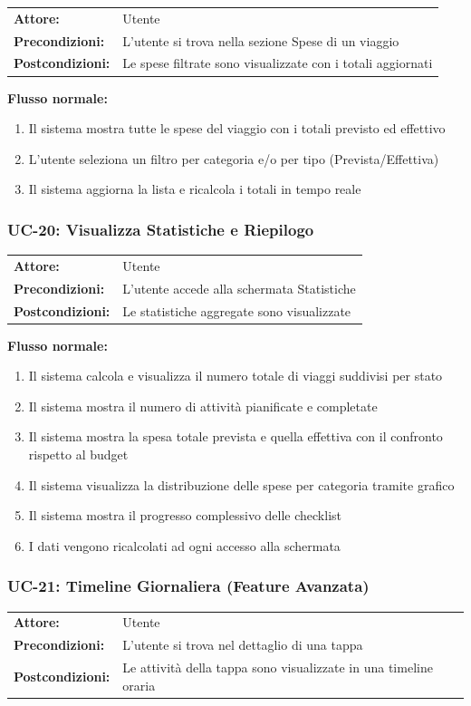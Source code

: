 \documentclass[12pt, a4paper]{article}
\makeatletter
\newcommand{\ucblock}[3]{%
  \noindent
  \begin{tabular}{@{}ll@{}}
    \textbf{Attore:}         & #1 \\
    \textbf{Precondizioni:}  & #2 \\
    \textbf{Postcondizioni:} & #3 \\
  \end{tabular}%
  \medskip
}
\makeatother
\begin{document}
\ucblock{Utente}{L'utente si trova nella sezione Spese di un viaggio}{Le spese filtrate sono visualizzate con i totali aggiornati}

\noindent\textbf{Flusso normale:}
\begin{enumerate}[leftmargin=1.5em, itemsep=1pt]
  \item Il sistema mostra tutte le spese del viaggio con i totali previsto ed effettivo
  \item L'utente seleziona un filtro per categoria e/o per tipo (Prevista/Effettiva)
  \item Il sistema aggiorna la lista e ricalcola i totali in tempo reale
\end{enumerate}

\subsubsection{UC-20: Visualizza Statistiche e Riepilogo}

\ucblock{Utente}{L'utente accede alla schermata Statistiche}{Le statistiche aggregate sono visualizzate}

\noindent\textbf{Flusso normale:}
\begin{enumerate}[leftmargin=1.5em, itemsep=1pt]
  \item Il sistema calcola e visualizza il numero totale di viaggi suddivisi per stato
  \item Il sistema mostra il numero di attività pianificate e completate
  \item Il sistema mostra la spesa totale prevista e quella effettiva con il confronto
    rispetto al budget
  \item Il sistema visualizza la distribuzione delle spese per categoria tramite grafico
  \item Il sistema mostra il progresso complessivo delle checklist
  \item I dati vengono ricalcolati ad ogni accesso alla schermata
\end{enumerate}

\subsubsection{UC-21: Timeline Giornaliera (Feature Avanzata)}

\ucblock{Utente}{L'utente si trova nel dettaglio di una tappa}{Le attività della tappa sono visualizzate in una timeline oraria}
\end{document}

